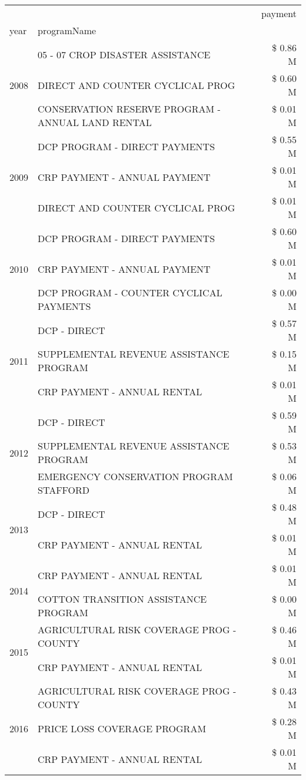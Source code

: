 \begin{tabular}{llr}
\toprule
 &  & payment \\
year & programName &  \\
\midrule
\multirow[t]{3}{*}{2008} & 05 - 07 CROP DISASTER ASSISTANCE & \$ 0.86 M \\
 & DIRECT AND COUNTER CYCLICAL PROG & \$ 0.60 M \\
 & CONSERVATION RESERVE PROGRAM - ANNUAL LAND RENTAL & \$ 0.01 M \\
\cline{1-3}
\multirow[t]{3}{*}{2009} & DCP PROGRAM - DIRECT PAYMENTS & \$ 0.55 M \\
 & CRP PAYMENT - ANNUAL PAYMENT & \$ 0.01 M \\
 & DIRECT AND COUNTER CYCLICAL PROG & \$ 0.01 M \\
\cline{1-3}
\multirow[t]{3}{*}{2010} & DCP PROGRAM - DIRECT PAYMENTS & \$ 0.60 M \\
 & CRP PAYMENT - ANNUAL PAYMENT & \$ 0.01 M \\
 & DCP PROGRAM - COUNTER CYCLICAL PAYMENTS & \$ 0.00 M \\
\cline{1-3}
\multirow[t]{3}{*}{2011} & DCP - DIRECT & \$ 0.57 M \\
 & SUPPLEMENTAL REVENUE ASSISTANCE PROGRAM & \$ 0.15 M \\
 & CRP PAYMENT - ANNUAL RENTAL & \$ 0.01 M \\
\cline{1-3}
\multirow[t]{3}{*}{2012} & DCP - DIRECT & \$ 0.59 M \\
 & SUPPLEMENTAL REVENUE ASSISTANCE PROGRAM & \$ 0.53 M \\
 & EMERGENCY CONSERVATION PROGRAM STAFFORD & \$ 0.06 M \\
\cline{1-3}
\multirow[t]{2}{*}{2013} & DCP - DIRECT & \$ 0.48 M \\
 & CRP PAYMENT - ANNUAL RENTAL & \$ 0.01 M \\
\cline{1-3}
\multirow[t]{2}{*}{2014} & CRP PAYMENT - ANNUAL RENTAL & \$ 0.01 M \\
 & COTTON TRANSITION ASSISTANCE PROGRAM & \$ 0.00 M \\
\cline{1-3}
\multirow[t]{2}{*}{2015} & AGRICULTURAL RISK COVERAGE PROG - COUNTY & \$ 0.46 M \\
 & CRP PAYMENT - ANNUAL RENTAL & \$ 0.01 M \\
\cline{1-3}
\multirow[t]{3}{*}{2016} & AGRICULTURAL RISK COVERAGE PROG - COUNTY & \$ 0.43 M \\
 & PRICE LOSS COVERAGE PROGRAM & \$ 0.28 M \\
 & CRP PAYMENT - ANNUAL RENTAL & \$ 0.01 M \\

\end{tabular}
